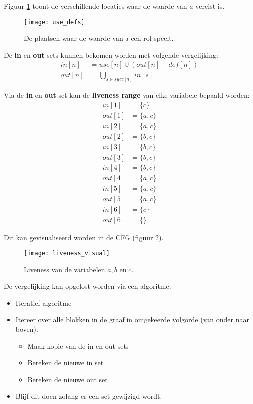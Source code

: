 Figuur \ref{fig:use_defs} toont de verschillende locaties waar de waarde van $a$ vereist is.

\begin{figure}[ht]
	\centering
	\texttt{[image: use\_defs]}
	\caption{De plaatsen waar de waarde van $a$ een rol speelt.}
	\label{fig:use_defs}
\end{figure}

De \textbf{in} en \textbf{out} sets kunnen bekomen worden met volgende vergelijking:
\begin{align*}
	in[n] & = use[n] \cup (out[n] - def[n]) \\
	out[n] & = \bigcup_{s \in succ[n]} in[s]
\end{align*}

Via de \textbf{in} en \textbf{out} set kan de \textbf{liveness range} van elke variabele bepaald worden:
\begin{align*}
in[1] & = \{c\} \\
out[1] & = \{a, c\}\\
in[2] & = \{a, c\}\\
out[2] & = \{b, c\}\\
in[3] & = \{b, c\}\\
out[3] & = \{b, c\}\\
in[4] & = \{b, c\}\\
out[4] & = \{a, c\}\\
in[5] & = \{a, c\}\\
out[5] & = \{a, c\}\\
in[6] & = \{c\}\\
out[6] & = \{ \}
\end{align*}

Dit kan gevisualiseerd worden in de CFG (figuur \ref{fig:liveness_visual}).
\begin{figure}[ht]
	\texttt{[image: liveness\_visual]}
	\caption{Liveness van de variabelen $a, b$ en $c$.}
	\label{fig:liveness_visual}
\end{figure}

De vergelijking kan opgelost worden via een algoritme.
\begin{itemize}
	\item Iteratief algoritme
	\item Itereer over alle blokken in de graaf in omgekeerde volgorde (van onder naar boven).
	\begin{itemize}
		\item Maak kopie van de in en out sets
		\item Bereken de nieuwe in set
		\item Bereken de nieuwe out set
	\end{itemize}
	\item Blijf dit doen zolang er een set gewijzigd wordt.
\end{itemize}

